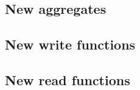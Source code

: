 \newpage
{}
\subsection{New aggregates}
\subsection{New write functions}
\subsection{New read functions}